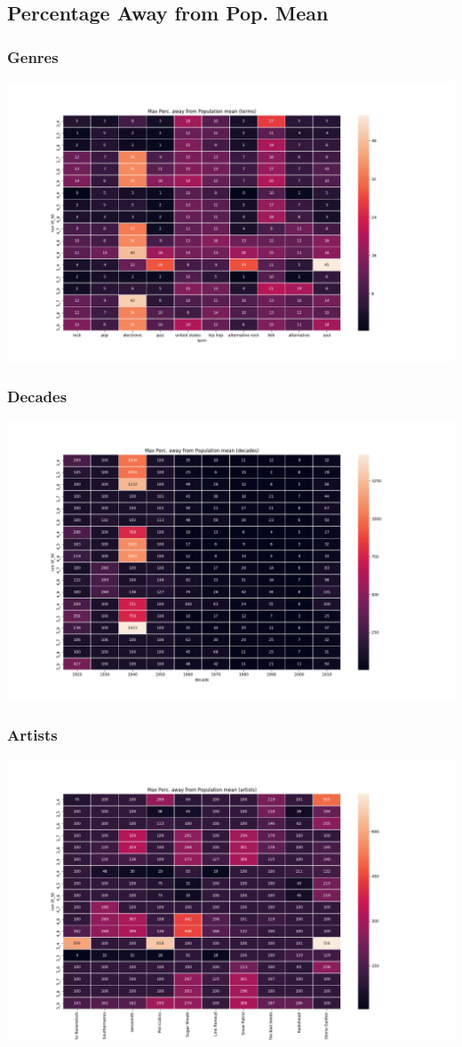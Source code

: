 \subsection{Percentage Away from Pop. Mean}
    \subsubsection{Genres}
        \includegraphics[width=1.2\textwidth]{perc_away_terms}
    \subsubsection{Decades}
        \includegraphics[width=1.2\textwidth]{perc_away_decades}
    \subsubsection{Artists}
        \includegraphics[width=1.2\textwidth]{perc_away_artists}

